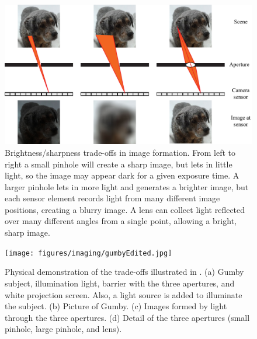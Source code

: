 \begin{figure}[h!]
\centerline{
\includegraphics[width=.9\linewidth]{figures/imaging/apertures_and_lenses.pdf}
}
\caption{Brightness/sharpness trade-offs in image formation. From left to right a small pinhole will create a sharp image, but lets in little light, so the image may appear dark for a given exposure time. A larger pinhole lets in more light and generates a brighter image, but each sensor element records light from many different image positions, creating a blurry image. A lens can collect light reflected over many different angles from a single point, allowing a bright, sharp image.}
\label{fig:pinholes}
\end{figure}


\begin{figure}
\centerline{
\texttt{[image: figures/imaging/gumbyEdited.jpg]}
}
\caption{Physical demonstration of the trade-offs illustrated in \fig{\ref{fig:pinholes}}. (a) Gumby subject, illumination light,
  barrier with the three apertures, and white projection screen. Also, a light source is added to illuminate the subject. (b) Picture of Gumby. (c)
  Images formed by light through the three apertures. (d) Detail of the three
  apertures (small pinhole, large pinhole, and lens).}
\label{fig:pinholeSize}
\end{figure}




